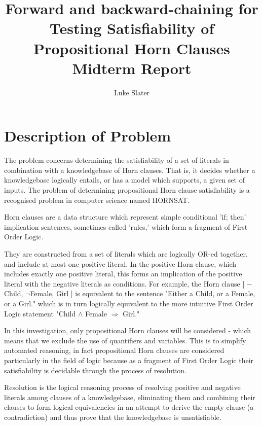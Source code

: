 \documentclass{article}
\begin{document}
\title{Forward and backward-chaining for Testing Satisfiability of Propositional Horn Clauses \protect\\ Midterm Report}
\author{Luke Slater}

\maketitle

\section{Description of Problem}

The problem concerns determining the satisfiability of a set of literals in
combination with a knowledgebase of Horn
clauses. That is, it decides whether
a knowledgebase logically entails, or has a model which supports, a given set of inputs. The problem
of determining propositional Horn clause satisfiability is a recognised problem 
in computer science named HORNSAT.\cite{hornsat}

Horn clauses are a data structure which represent simple conditional 'if; then'
implication sentences, sometimes called 'rules,' which form a fragment of First 
Order Logic.\cite{horn}

They are constructed from a set of literals which are logically OR-ed together, 
and include at most one
positive literal. In the positive Horn clause, which includes exactly one
positive literal, this forms an implication of the positive literal with the 
negative literals as conditions. For example, the Horn clause 
[ $\neg$Child, $\neg$Female, Girl ] is equivalent to the sentence "Either a
Child, or a Female, or a Girl." which is in turn logically equivalent to the
more intuitive First Order Logic statement 
"Child $\land$ Female $\Rightarrow$ Girl."

In this investigation, only propositional Horn clauses will be considered -
which means that we exclude the use of quantifiers and variables. This is to
simplify automated reasoning, in fact propositional Horn clauses are considered
particularly in the field of logic because as a fragment of First Order Logic 
their satisfiability is decidable through the process of resolution.

Resolution is the logical reasoning process of resolving positive and negative literals
among clauses of a knowledgebase, eliminating them and combining their clauses
to form logical equivalencies in an attempt to derive
the empty clause (a contradiction) and thus prove that the knowledgebase is
unsatisfiable.
\end{document}

